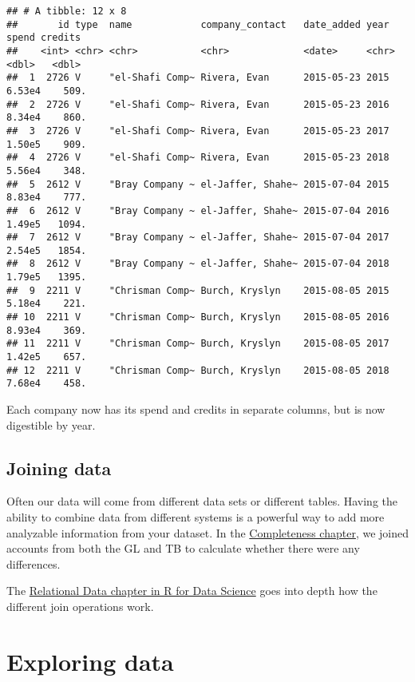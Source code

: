 \documentclass[
]{book}
\begin{document}
\begin{verbatim}
## # A tibble: 12 x 8
##       id type  name            company_contact   date_added year   spend credits
##    <int> <chr> <chr>           <chr>             <date>     <chr>  <dbl>   <dbl>
##  1  2726 V     "el-Shafi Comp~ Rivera, Evan      2015-05-23 2015  6.53e4    509.
##  2  2726 V     "el-Shafi Comp~ Rivera, Evan      2015-05-23 2016  8.34e4    860.
##  3  2726 V     "el-Shafi Comp~ Rivera, Evan      2015-05-23 2017  1.50e5    909.
##  4  2726 V     "el-Shafi Comp~ Rivera, Evan      2015-05-23 2018  5.56e4    348.
##  5  2612 V     "Bray Company ~ el-Jaffer, Shahe~ 2015-07-04 2015  8.83e4    777.
##  6  2612 V     "Bray Company ~ el-Jaffer, Shahe~ 2015-07-04 2016  1.49e5   1094.
##  7  2612 V     "Bray Company ~ el-Jaffer, Shahe~ 2015-07-04 2017  2.54e5   1854.
##  8  2612 V     "Bray Company ~ el-Jaffer, Shahe~ 2015-07-04 2018  1.79e5   1395.
##  9  2211 V     "Chrisman Comp~ Burch, Kryslyn    2015-08-05 2015  5.18e4    221.
## 10  2211 V     "Chrisman Comp~ Burch, Kryslyn    2015-08-05 2016  8.93e4    369.
## 11  2211 V     "Chrisman Comp~ Burch, Kryslyn    2015-08-05 2017  1.42e5    657.
## 12  2211 V     "Chrisman Comp~ Burch, Kryslyn    2015-08-05 2018  7.68e4    458.
\end{verbatim}

Each company now has its spend and credits in separate columns, but is now digestible by year.

\hypertarget{joining-data}{%
\section{Joining data}\label{joining-data}}

Often our data will come from different data sets or different tables. Having the ability to combine data from different systems is a powerful way to add more analyzable information from your dataset. In the \protect\hyperlink{completeness-join}{Completeness chapter}, we joined accounts from both the GL and TB to calculate whether there were any differences.

The \href{https://r4ds.had.co.nz/relational-data.html}{Relational Data chapter in R for Data Science} goes into depth how the different join operations work.

\hypertarget{exploring-data}{%
\chapter{Exploring data}\label{exploring-data}}
\end{document}
